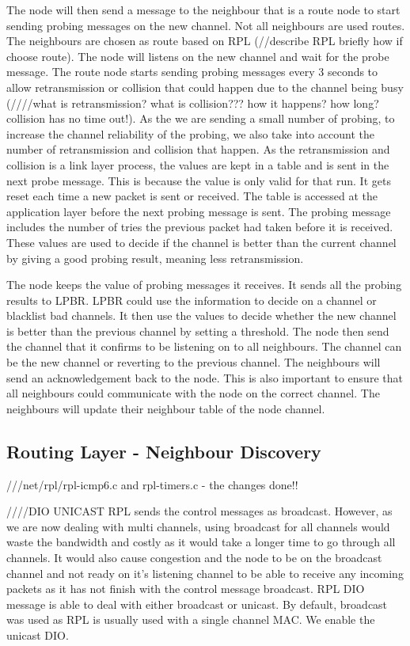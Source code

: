 The node will then send a message to the neighbour that is a route node to start sending probing messages on the new channel. Not all neighbours are used routes. The neighbours are chosen as route based on RPL (//describe RPL briefly how if choose route). The node will listens on the new channel and wait for the probe message. The route node starts sending probing messages every 3 seconds to allow retransmission or collision that could happen due to the channel being busy (////what is retransmission? what is collision??? how it happens? how long? collision has no time out!). As the we are sending a small number of probing, to increase the channel reliability of the probing, we also take into account the number of retransmission and collision that happen. As the retransmission and collision is a link layer process, the values are kept in a table and is sent in the next probe message. This is because the value is only valid for that run. It gets reset each time a new packet is sent or received. The table is accessed at the application layer before the next probing message is sent. The probing message includes the number of tries the previous packet had taken before it is received. These values are used to decide if the channel is better than the current channel by giving a good probing result, meaning less retransmission.

The node keeps the value of probing messages it receives. It sends all the probing results to LPBR. LPBR could use the information to decide on a channel or blacklist bad channels. It then use the values to decide whether the new channel is better than the previous channel by setting a threshold. The node then send the channel that it confirms to be listening on to all neighbours. The channel can be the new channel or reverting to the previous channel. The neighbours will send an acknowledgement back to the node. This is also important to ensure that all neighbours could communicate with the node on the correct channel. The neighbours will update their neighbour table of the node channel. 


\subsection{Routing Layer - Neighbour Discovery}
///net/rpl/rpl-icmp6.c and rpl-timers.c - the changes done!!

////DIO UNICAST
RPL sends the control messages as broadcast. However, as we are now dealing with multi channels, using broadcast for all channels would waste the bandwidth and costly as it would take a longer time to go through all channels. It would also cause congestion and the node to be on the broadcast channel and not ready on it's listening channel to be able to receive any incoming packets as it has not finish with the control message broadcast. RPL DIO message is able to deal with either broadcast or unicast. By default, broadcast was used as RPL is usually used with a single channel MAC. We enable the unicast DIO.

